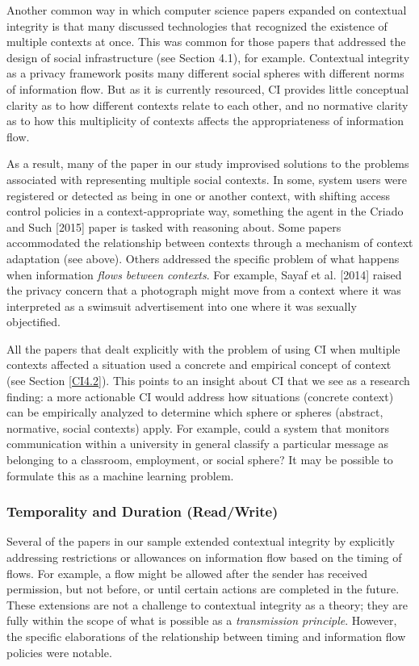 \documentclass[../thesis.tex]{subfiles}
\begin{document}
Another common way in which computer science papers expanded on
contextual integrity is that many discussed technologies that
recognized the existence of multiple contexts at once. This was common
for those papers that addressed the design of social infrastructure
(see Section 4.1), for example. Contextual integrity as a privacy
framework posits many different social spheres with different norms of
information flow. But as it is currently resourced, CI provides little
conceptual clarity as to how different contexts relate to each other,
and no normative clarity as to how this multiplicity of contexts
affects the appropriateness of information flow.

As a result, many of the paper in our study improvised solutions to the
problems associated with representing multiple social contexts. In
some, system users were registered or detected as being in one or
another context, with shifting access control policies in a
context-appropriate way, something the agent in the Criado and Such
[2015] paper is tasked with reasoning about. Some papers accommodated
the relationship between contexts through a mechanism of context
adaptation (see above). Others addressed the specific problem of what
happens when information \textit{flows between contexts}. For example,
Sayaf et al. [2014] raised the privacy concern that a photograph might
move from a context where it was interpreted as a swimsuit
advertisement into one where it was sexually objectified. 

All the papers that dealt explicitly with the problem of using CI when
multiple contexts affected a situation used a concrete and empirical
concept of context (see Section \ref{CI4.2}).
This points to an insight about CI that we see as a research finding:
a more actionable CI would address how situations (concrete context)
can be empirically analyzed to determine which sphere or spheres
(abstract, normative, social contexts) apply. For example, could a
system that monitors communication within a university in general
classify a particular message as belonging to a classroom, employment,
or social sphere? It may be possible to formulate this as a machine
learning problem.

\subsubsection{Temporality and Duration (Read/Write)}
\label{CI4.4.3}

Several of the papers in our sample extended contextual integrity by
explicitly addressing restrictions or allowances on information flow
based on the timing of flows. For example, a flow might be allowed
after the sender has received permission, but not before, or until
certain actions are completed in the future. These extensions are not a
challenge to contextual integrity as a theory; they are fully within
the scope of what is possible as a \textit{transmission principle}.
However, the specific elaborations of the relationship between timing
and information flow policies were notable.
\end{document}

